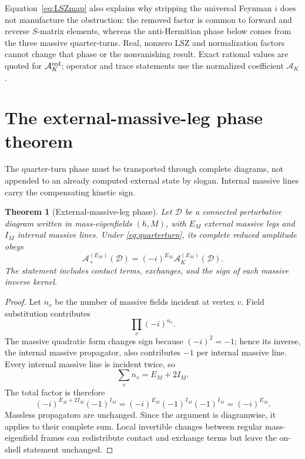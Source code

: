 \documentclass[11pt]{article}
\newtheorem{theorem}{Theorem}[section]
\theoremstyle{definition}
\theoremstyle{remark}
\newcommand{\AK}{\mathcal A_K}
\newcommand{\AKred}{\mathcal A_K^{\rm red}}
\begin{document}
Equation~\eqref{eq:LSZmap} also explains why stripping the universal
Feynman $i$ does not manufacture the obstruction: the removed factor is
common to forward and reverse $S$-matrix elements, whereas the
anti-Hermitian phase below comes from the three massive quarter-turns.
Real, nonzero LSZ and normalization factors cannot change that phase or
the nonvanishing result.  Exact rational values are quoted for
$\AKred$; operator and trace statements use the normalized coefficient
$\AK$.

\section{The external-massive-leg phase theorem}\label{sec:phase}

The quarter-turn phase must be transported through complete diagrams,
not appended to an already computed external state by slogan.  Internal
massive lines carry the compensating kinetic sign.

\begin{theorem}[External-massive-leg phase]\label{thm:phase}
Let $\mathcal D$ be a connected perturbative diagram written in
mass-eigenfields $(h,M)$, with $E_M$ external massive legs and $I_M$
internal massive lines.  Under \eqref{eq:quarterturn}, its complete
reduced amplitude obeys
\begin{equation}\label{eq:phasetheorem}
\mathcal A_+^{(E_M)}(\mathcal D)
=(-i)^{E_M}\mathcal A_K^{(E_M)}(\mathcal D).
\end{equation}
The statement includes contact terms, exchanges, and the sign of each
massive inverse kernel.
\end{theorem}

\begin{proof}
Let $n_v$ be the number of massive fields incident at vertex $v$.  Field
substitution contributes
\begin{equation}
\prod_v(-i)^{n_v}.
\end{equation}
The massive quadratic form changes sign because
$(-i)^2=-1$; hence its inverse, the internal massive propagator, also
contributes $-1$ per internal massive line.  Every internal massive line
is incident twice, so
\begin{equation}
\sum_v n_v=E_M+2I_M.
\end{equation}
The total factor is therefore
\begin{equation}
(-i)^{E_M+2I_M}(-1)^{I_M}
=(-i)^{E_M}(-1)^{I_M}(-1)^{I_M}
=(-i)^{E_M}.
\end{equation}
Massless propagators are unchanged.  Since the argument is diagramwise,
it applies to their complete sum.  Local invertible changes between
regular mass-eigenfield frames can redistribute contact and exchange
terms but leave the on-shell statement unchanged.
\end{proof}
\end{document}
